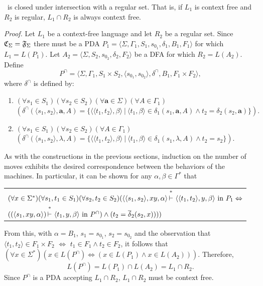 \begin{thm}\label{thm-10.6}
\CSIG\ is closed under intersection with a regular set. That is, if $L_1$ is
context free and $R_2$ is regular, $L_1\cap R_2$ is always context free.

\emph{Proof.} Let $L_1$ be a context-free language and let $R_2$ be a regular
set. Since $\mathfrak{C}_\Sigma=\mathfrak{F}_\Sigma$ there must be a PDA $P_1=\langle\Sigma,\Gamma_1,S_1,
s_{0_1},\delta_1,B_1,F_1\rangle$ for which $L_1=L(P_1)$. Let $A_2=\langle\Sigma,
S_2,s_{0_2},\delta_2,F_2\rangle$ be a DFA for which $R_2=L(A_2)$. Define
\[ P^{\cap} = \langle\Sigma,\Gamma_1,S_1\times S_2,\langle s_{0_1},s_{0_2}
	\rangle,\delta^{\cap},B_1,F_1\times F_2\rangle, \]
where $\delta^{\cap}$ is defined by:
\begin{enumerate}
\item $(\forall s_1\in S_1)(\forall s_2\in S_2)(\forall\pmb{a}\in\Sigma)(\forall
	A\in\Gamma_1)$ \\
	$(\delta^{\cap}(\langle s_1,s_2\rangle,\pmb{a},A)=\{\langle\langle t_1,
	t_2\rangle,\beta\rangle\ |\ \langle t_1,\beta\rangle\in\delta_1(s_1,\pmb{a},
	A)\wedge t_2=\delta_2(s_2,\pmb{a})\}).$
\item $(\forall s_1\in S_1)(\forall s_2\in S_2)(\forall A\in\Gamma_1)$ \\
	$(\delta^{\cap}(\langle s_1,s_2\rangle,\lambda,A)=\{\langle\langle t_1,
	t_2\rangle,\beta\rangle\ |\ \langle t_1,\beta\rangle\in\delta_1(s_1,\lambda,A)\wedge t_2
	=s_2\}).$
\end{enumerate}

As with the constructions in the previous sections, induction on the number of
moves exhibits the desired correspondence between the behaviors of the machines.
In particular, it can be shown for any $\alpha,\beta\in\Gamma^*$ that
\begin{center}\begin{tabular}{l}
$(\forall x\in\Sigma^*)(\forall s_1,t_1\in S_1)(\forall s_2,t_2\in S_2)
	(\langle\langle s_1,s_2\rangle,xy,\alpha\rangle\Dvdash\langle\langle
	t_1,t_2\rangle,y,\beta\rangle\text{ in }P_1\Leftrightarrow$ \\
$((\langle s_1,xy,\alpha\rangle)\Dvdash\langle t_1,y,\beta\rangle\text{ in }
	P^{\cap})\wedge(t_2=\DBAR_2(s_2,x))))$
\end{tabular}\end{center}
From this, with $\alpha=B_1$, $s_1 = s_{0_1}$, $s_2 = s_{0_2}$ and the observation that $\langle t_1,t_2\rangle\in
F_1\times F_2$ $\Leftrightarrow$ $t_1\in F_1\wedge t_2\in F_2$, it follows that $(\forall x\in
\Sigma^*)(x\in L(P^{\cap})\Leftrightarrow (x\in L(P_1)\wedge x\in L(A_2)))$.
Therefore,
\[ L(P^{\cap})=L(P_1)\cap L(A_2)=L_1\cap R_2. \]
Since $P^{\cap}$ is a PDA accepting $L_1\cap R_2$, $L_1\cap R_2$ must be context
free.
\end{thm}

